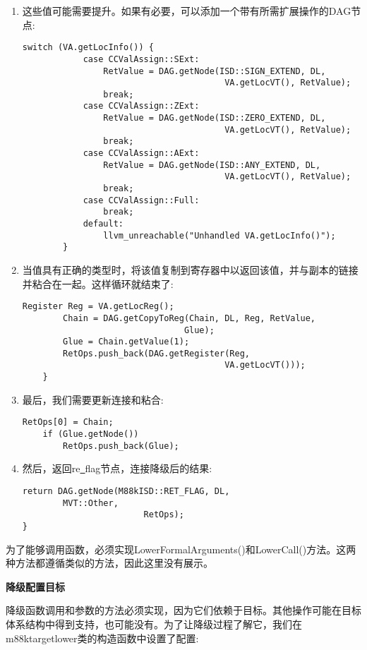 \begin{enumerate}
\item 这些值可能需要提升。如果有必要，可以添加一个带有所需扩展操作的DAG节点:
\begin{lstlisting}[caption={}]
		switch (VA.getLocInfo()) {
			case CCValAssign::SExt:
				RetValue = DAG.getNode(ISD::SIGN_EXTEND, DL,
										VA.getLocVT(), RetValue);
				break;
			case CCValAssign::ZExt:
				RetValue = DAG.getNode(ISD::ZERO_EXTEND, DL,
										VA.getLocVT(), RetValue);
				break;
			case CCValAssign::AExt:
				RetValue = DAG.getNode(ISD::ANY_EXTEND, DL,
										VA.getLocVT(), RetValue);
				break;
			case CCValAssign::Full:
				break;
			default:
				llvm_unreachable("Unhandled VA.getLocInfo()");
		}
\end{lstlisting}

\item 当值具有正确的类型时，将该值复制到寄存器中以返回该值，并与副本的链接并粘合在一起。这样循环就结束了:
\begin{lstlisting}[caption={}]
		Register Reg = VA.getLocReg();
		Chain = DAG.getCopyToReg(Chain, DL, Reg, RetValue,
								Glue);
		Glue = Chain.getValue(1);
		RetOps.push_back(DAG.getRegister(Reg,
										VA.getLocVT()));
	}
\end{lstlisting}

\item 最后，我们需要更新连接和粘合:
\begin{lstlisting}[caption={}]
	RetOps[0] = Chain;
	if (Glue.getNode())
		RetOps.push_back(Glue);
\end{lstlisting}
	
\item 然后，返回re\underline{~}flag节点，连接降级后的结果:
\begin{lstlisting}[caption={}]
	return DAG.getNode(M88kISD::RET_FLAG, DL,
		MVT::Other,
						RetOps);
}
\end{lstlisting}
	
\end{enumerate}

为了能够调用函数，必须实现LowerFormalArguments()和LowerCall()方法。这两种方法都遵循类似的方法，因此这里没有展示。\par

\hspace*{\fill} \par %
\textbf{降级配置目标}

降级函数调用和参数的方法必须实现，因为它们依赖于目标。其他操作可能在目标体系结构中得到支持，也可能没有。为了让降级过程了解它，我们在m88ktargetlower类的构造函数中设置了配置:\par

